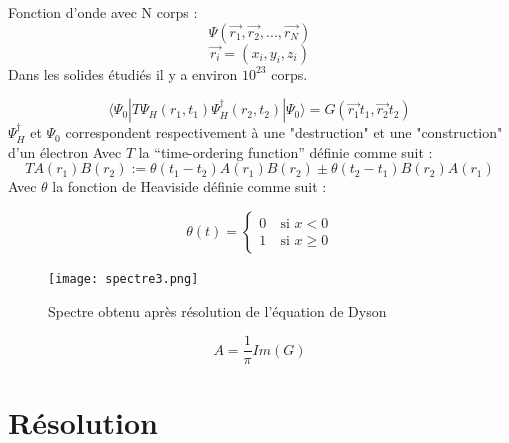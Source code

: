 \documentclass{beamer}
\begin{document}
\begin{frame}
Fonction d'onde avec N corps :
\begin{equation}
 \Psi(\vec{r_1}, \vec{r_2}, ..., \vec{r_N})
\end{equation}
\begin{equation}
 \vec{r_i} = (x_i, y_i, z_i)
\end{equation}
Dans les solides \'etudi\'es il y a environ $10^{23}$ corps.
\end{frame}







\begin{frame}
 \begin{equation}
 \langle \Psi_0 | T \Psi_H (r_1, t_1) \Psi_H^\dagger (r_2, t_2) | \Psi_0 \rangle = G(\vec{r_1} t_1, \vec{r_2}  t_2)
\end{equation}
$\Psi_H^\dagger$ et $\Psi_0$ correspondent respectivement à une "destruction" et une "construction" d'un \'electron
Avec $T$ la ``time-ordering function'' d\'efinie comme suit :
\begin{equation}
 T{A(r_1)B(r_2)} := \theta(t_1 - t_2)A(r_1)B(r_2) \pm \theta(t_2 - t_1)B(r_2) A(r_1)
\end{equation}
Avec $\theta$ la fonction de Heaviside d\'efinie comme suit :

\begin{equation}
\theta(t) = 
\left\{ \begin{array}{rl}
 0 &\ \text{si }x <0\\
 1 &\ \text{si }x \geq 0
\end{array} \right.
\end{equation}


\end{frame}


\begin{frame}
 \begin{figure}
\caption{Spectre obtenu apr\`es r\'esolution de l'\'equation de Dyson}
\texttt{[image: spectre3.png]}
\label{solb}
\end{figure}
\begin{equation}
 A = \frac{1}{\pi}Im(G)
\end{equation}
\end{frame}

\section{R\'esolution}
\end{document}
